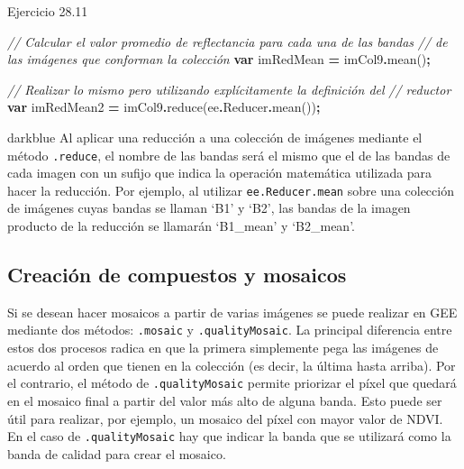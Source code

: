 \documentclass[
  12pt,
  letterpaper,
  twoside]{book}
\newenvironment{Shaded}{\begin{snugshade}}{\end{snugshade}}
\newcommand{\AttributeTok}[1]{\textcolor[rgb]{0.77,0.63,0.00}{#1}}
\newcommand{\CommentTok}[1]{\textcolor[rgb]{0.56,0.35,0.01}{\textit{#1}}}
\newcommand{\FunctionTok}[1]{\textcolor[rgb]{0.00,0.00,0.00}{#1}}
\newcommand{\KeywordTok}[1]{\textcolor[rgb]{0.13,0.29,0.53}{\textbf{#1}}}
\newcommand{\NormalTok}[1]{#1}
\newcommand{\OperatorTok}[1]{\textcolor[rgb]{0.81,0.36,0.00}{\textbf{#1}}}
\begin{document}
Ejercicio 28.11

\begin{Shaded}
\begin{Highlighting}[]
\CommentTok{// Calcular el valor promedio de reflectancia para cada una de las bandas }
\CommentTok{// de las imágenes que conforman la colección}
\KeywordTok{var}\NormalTok{ imRedMean }\OperatorTok{=}\NormalTok{ imCol9}\OperatorTok{.}\FunctionTok{mean}\NormalTok{()}\OperatorTok{;}

\CommentTok{// Realizar lo mismo pero utilizando explícitamente la definición del }
\CommentTok{// reductor}
\KeywordTok{var}\NormalTok{ imRedMean2 }\OperatorTok{=}\NormalTok{ imCol9}\OperatorTok{.}\FunctionTok{reduce}\NormalTok{(ee}\OperatorTok{.}\AttributeTok{Reducer}\OperatorTok{.}\FunctionTok{mean}\NormalTok{())}\OperatorTok{;}
\end{Highlighting}
\end{Shaded}

\begin{bluebox2}

\begin{awesomeblock}{5pt}{\faLightbulb}{darkblue}
Al aplicar una reducción a una colección de imágenes mediante el método \texttt{.reduce}, el nombre de las bandas será el mismo que el de las bandas de cada imagen con un sufijo que indica la operación matemática utilizada para hacer la reducción. Por ejemplo, al utilizar \texttt{ee.Reducer.mean} sobre una colección de imágenes cuyas bandas se llaman `B1' y `B2', las bandas de la imagen producto de la reducción se llamarán `B1\_mean' y `B2\_mean'.

\end{awesomeblock}

\end{bluebox2}

\hypertarget{creaciuxf3n-de-compuestos-y-mosaicos}{%
\subsection{Creación de compuestos y mosaicos}\label{creaciuxf3n-de-compuestos-y-mosaicos}}

Si se desean hacer mosaicos a partir de varias imágenes se puede realizar en GEE mediante dos métodos: \texttt{.mosaic} y \texttt{.qualityMosaic}. La principal diferencia entre estos dos procesos radica en que la primera simplemente pega las imágenes de acuerdo al orden que tienen en la colección (es decir, la última hasta arriba). Por el contrario, el método de \texttt{.qualityMosaic} permite priorizar el píxel que quedará en el mosaico final a partir del valor más alto de alguna banda. Esto puede ser útil para realizar, por ejemplo, un mosaico del píxel con mayor valor de NDVI. En el caso de \texttt{.qualityMosaic} hay que indicar la banda que se utilizará como la banda de calidad para crear el mosaico.
\end{document}
